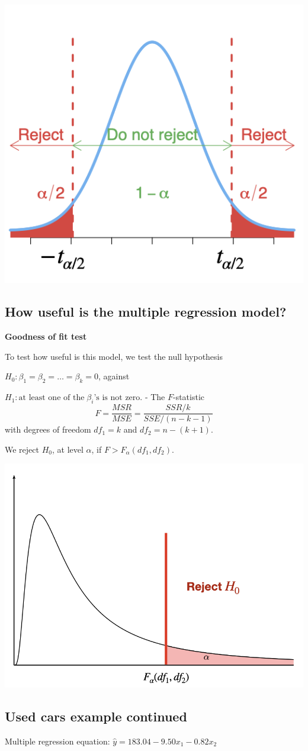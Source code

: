 \documentclass[
]{article}
\begin{document}
\begin{center}\includegraphics[width=0.3\linewidth,height=0.3\textheight]{figures/Ttest2} \end{center}

\hypertarget{how-useful-is-the-multiple-regression-model}{%
\subsection{How useful is the multiple regression
model?}\label{how-useful-is-the-multiple-regression-model}}

\textbf{Goodness of fit test}

To test how useful is this model, we test the null hypothesis

\(H_0: \beta_1=\beta_2=\ldots =\beta_k=0\), against

\(H_1: \text{at least one of the} \;\beta_i \text{'s is not zero}\). -
The \(F\)-statistic \[F=\frac{MSR}{MSE}=\frac{SSR/k}{SSE/(n-k-1)}\] with
degrees of freedom \(df_1=k\) and \(df_2=n-(k+1)\).

We reject \(H_0\), at level \(\alpha\), if \(F>F_{\alpha}(df_1,df_2)\).

\begin{center}\includegraphics[width=0.4\linewidth,height=0.4\textheight]{figures/Ftest} \end{center}

\hypertarget{used-cars-example-continued}{%
\subsection{Used cars example
continued}\label{used-cars-example-continued}}

Multiple regression equation: \(\hat{y}=183.04-9.50 x_1- 0.82 x_2\)
\end{document}
